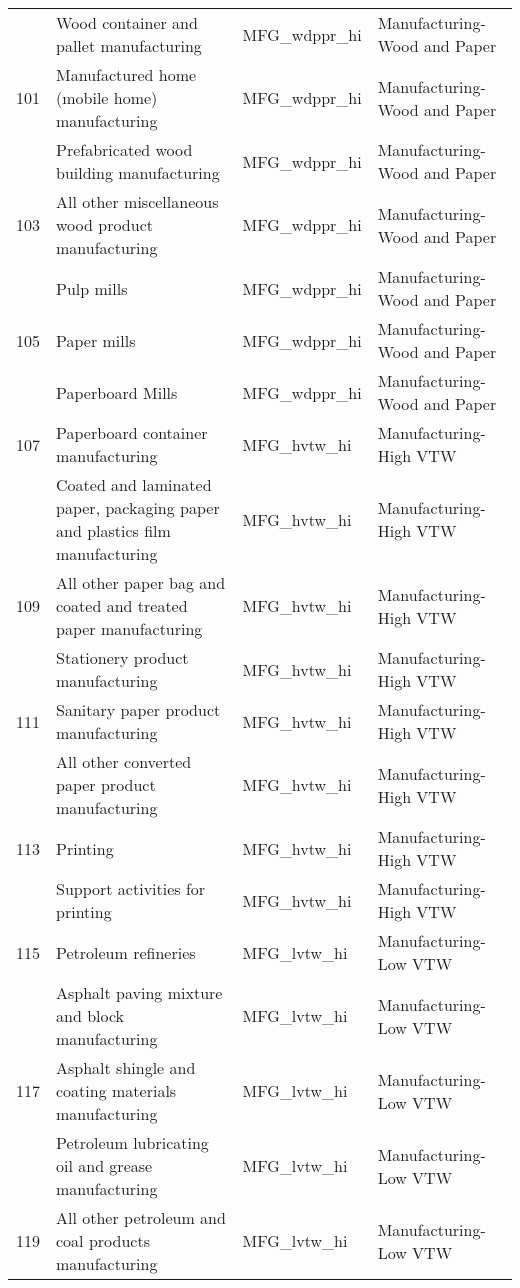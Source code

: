 \begin{landscape}
\begin{small}
\begin{longtable}{clll}
\gray 100 & Wood container and pallet manufacturing & MFG\_wdppr\_hi & Manufacturing-Wood and Paper \\
101 & Manufactured home (mobile home) manufacturing & MFG\_wdppr\_hi & Manufacturing-Wood and Paper \\
\gray 102 & Prefabricated wood building manufacturing & MFG\_wdppr\_hi & Manufacturing-Wood and Paper \\
103 & All other miscellaneous wood product manufacturing & MFG\_wdppr\_hi & Manufacturing-Wood and Paper \\
\gray 104 & Pulp mills & MFG\_wdppr\_hi & Manufacturing-Wood and Paper \\
105 & Paper mills & MFG\_wdppr\_hi & Manufacturing-Wood and Paper \\
\gray 106 & Paperboard Mills & MFG\_wdppr\_hi & Manufacturing-Wood and Paper \\
107 & Paperboard container manufacturing & MFG\_hvtw\_hi & Manufacturing-High VTW \\
\gray 108 & Coated and laminated paper, packaging paper and plastics film manufacturing & MFG\_hvtw\_hi & Manufacturing-High VTW \\
109 & All other paper bag and coated and treated paper manufacturing & MFG\_hvtw\_hi & Manufacturing-High VTW \\
\gray 110 & Stationery product manufacturing & MFG\_hvtw\_hi & Manufacturing-High VTW \\
111 & Sanitary paper product manufacturing & MFG\_hvtw\_hi & Manufacturing-High VTW \\
\gray 112 & All other converted paper product manufacturing & MFG\_hvtw\_hi & Manufacturing-High VTW \\
113 & Printing & MFG\_hvtw\_hi & Manufacturing-High VTW \\
\gray 114 & Support activities for printing & MFG\_hvtw\_hi & Manufacturing-High VTW \\
115 & Petroleum refineries & MFG\_lvtw\_hi & Manufacturing-Low VTW \\
\gray 116 & Asphalt paving mixture and block manufacturing & MFG\_lvtw\_hi & Manufacturing-Low VTW \\
117 & Asphalt shingle and coating materials manufacturing & MFG\_lvtw\_hi & Manufacturing-Low VTW \\
\gray 118 & Petroleum lubricating oil and grease manufacturing & MFG\_lvtw\_hi & Manufacturing-Low VTW \\
119 & All other petroleum and coal products manufacturing & MFG\_lvtw\_hi & Manufacturing-Low VTW \\

\end{longtable}
\end{small}
\end{landscape}

